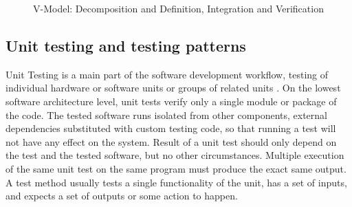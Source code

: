 \begin{figure}

\centering
{}

\caption{V-Model: Decomposition and Definition, Integration and Verification} 
\label{fig:vmodel}
\end{figure}
\subsection{Unit testing and testing patterns}
Unit Testing is a main part of the software development workflow, testing of individual hardware or software units or groups of related units \cite{159342}. On the lowest software architecture level, unit tests verify only a single module or package of the code. The tested software runs isolated from other components, external dependencies substituted with custom testing code, so that running a test will not have any effect on the system. Result of a unit test should only depend on the test and the tested software, but no other circumstances. Multiple execution of the same unit test on the same program must produce the exact same output. A test method usually tests a single functionality of the unit, has a set of inputs, and expects a set of outputs or some action to happen.

